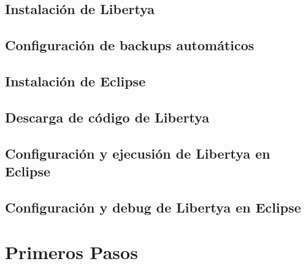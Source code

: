 \documentclass[letterpaper,10pt,spanish]{sphinxmanual}
\begin{document}
\section{Instalación de Libertya}
\label{tecnica:instalacion-de-libertya}

\section{Configuración de backups automáticos}
\label{tecnica:configuracion-de-backups-automaticos}

\section{Instalación de Eclipse}
\label{tecnica:instalacion-de-eclipse}

\section{Descarga de código de Libertya}
\label{tecnica:descarga-de-codigo-de-libertya}

\section{Configuración y ejecusión de Libertya en Eclipse}
\label{tecnica:configuracion-y-ejecusion-de-libertya-en-eclipse}

\section{Configuración y debug de Libertya en Eclipse}
\label{tecnica:configuracion-y-debug-de-libertya-en-eclipse}

\chapter{Primeros Pasos}
\label{acceso:primeros-pasos}\label{acceso::doc}
\end{document}
